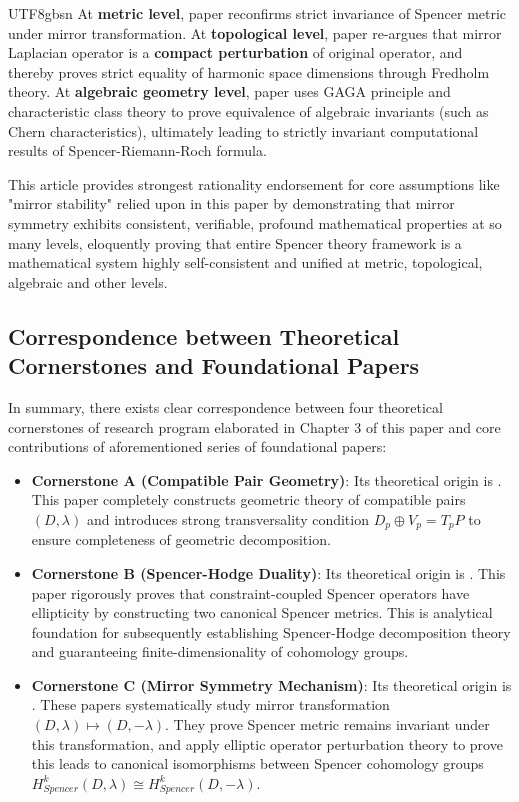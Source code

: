 \documentclass[a4paper,12pt]{extarticle}
\theoremstyle{definition}
\begin{document}
\begin{CJK}{UTF8}{gbsn}
At \textbf{metric level}, paper reconfirms strict invariance of Spencer metric under mirror transformation. At \textbf{topological level}, paper re-argues that mirror Laplacian operator is a \textbf{compact perturbation} of original operator, and thereby proves strict equality of harmonic space dimensions through Fredholm theory. At \textbf{algebraic geometry level}, paper uses GAGA principle and characteristic class theory to prove equivalence of algebraic invariants (such as Chern characteristics), ultimately leading to strictly invariant computational results of Spencer-Riemann-Roch formula.

This article provides strongest rationality endorsement for core assumptions like "mirror stability" relied upon in this paper by demonstrating that mirror symmetry exhibits consistent, verifiable, profound mathematical properties at so many levels, eloquently proving that entire Spencer theory framework is a mathematical system highly self-consistent and unified at metric, topological, algebraic and other levels.

\subsection{Correspondence between Theoretical Cornerstones and Foundational Papers}
\label{subsec:roadmap_summary}
In summary, there exists clear correspondence between four theoretical cornerstones of research program elaborated in Chapter 3 of this paper and core contributions of aforementioned series of foundational papers:

\begin{itemize}
    \item \textbf{Cornerstone A (Compatible Pair Geometry)}: Its theoretical origin is \cite{zheng2025dynamical}. This paper completely constructs geometric theory of compatible pairs $(D,\lambda)$ and introduces strong transversality condition $D_p \oplus V_p = T_pP$ to ensure completeness of geometric decomposition.

    \item \textbf{Cornerstone B (Spencer-Hodge Duality)}: Its theoretical origin is \cite{zheng2025constructing}. This paper rigorously proves that constraint-coupled Spencer operators have ellipticity by constructing two canonical Spencer metrics. This is analytical foundation for subsequently establishing Spencer-Hodge decomposition theory and guaranteeing finite-dimensionality of cohomology groups.

    \item \textbf{Cornerstone C (Mirror Symmetry Mechanism)}: Its theoretical origin is \cite{zheng2025mirror}. These papers systematically study mirror transformation $(D,\lambda) \mapsto (D,-\lambda)$. They prove Spencer metric remains invariant under this transformation, and apply elliptic operator perturbation theory to prove this leads to canonical isomorphisms between Spencer cohomology groups $H_{Spencer}^k(D, \lambda) \cong H_{Spencer}^k(D, -\lambda)$.


\end{itemize}
\end{CJK}
\end{document}
